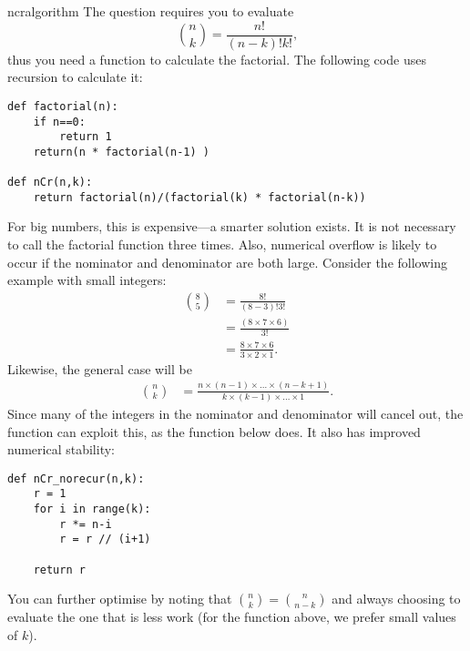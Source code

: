 \begin{answer}{ncralgorithm}
The question requires you to evaluate
\[
\binom{n}{k} = \frac{n!}{ (n-k)! k! }
\text{,}
\]
thus you need a function to calculate the factorial.
The following code uses recursion to calculate it:
\begin{verbatim}
def factorial(n):
    if n==0:
        return 1
    return(n * factorial(n-1) )

def nCr(n,k):
    return factorial(n)/(factorial(k) * factorial(n-k))
\end{verbatim}
For big numbers, this is expensive---a smarter solution exists.
It is not necessary to call the factorial function three times.
Also, numerical overflow is likely to occur if the nominator and denominator are both large.
Consider the following example with small integers:
\begin{align*}
\binom{8}{5} &= \frac{8!}{ (8-3)! 3! } \\
             &= \frac{(8 \times 7 \times 6 )}{3!} \\
             &= \frac{8 \times 7 \times 6 }{  3 \times 2 \times 1 }
\text{.}
\end{align*}
Likewise, the general case will be
\begin{align*}
\binom{n}{k}
             &= \frac
             { n \times (n-1) \times  \ldots \times (n-k+1) }
             { k \times (k-1) \times \ldots \times 1 }
\text{.}
\end{align*}
Since many of the integers in the nominator and denominator will cancel out, the function can exploit this, as the function below does. It also has improved numerical stability:
\begin{verbatim}
def nCr_norecur(n,k):
    r = 1
    for i in range(k):
        r *= n-i
        r = r // (i+1)

    return r
\end{verbatim}
You can further optimise by noting that $\binom{n}{k}=\binom{n}{n-k}$ and always choosing to evaluate the one that is less work (for the function above, we prefer small values of $k$).
\end{answer}
